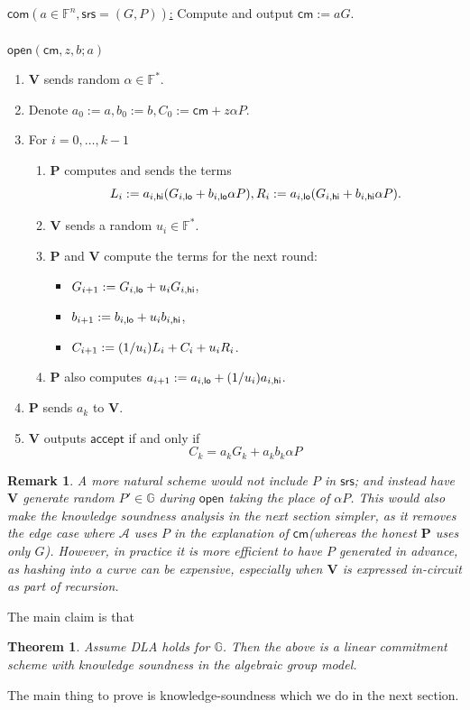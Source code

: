 \documentclass[11pt]{article} %
\newcommand{\G}{\ensuremath{{\mathbb G}}\xspace}
\newcommand{\F}{\ensuremath{\mathbb F}\xspace}
\newcommand{\Fstar}{\ensuremath{\mathbb F^*}\xspace}
\newcommand{\adv}{\ensuremath{\mathcal A}\xspace}
\newcommand{\srs}{\ensuremath{\mathsf{srs}}\xspace}
\newcommand{\com}{\ensuremath{\mathsf{com}}\xspace}
\newcommand{\cm}{\ensuremath{\mathsf{cm}}\xspace}
\newcommand{\open}{\ensuremath{\mathsf{open}}\xspace}
\newcommand{\acc}{\ensuremath{\mathsf{accept}}\xspace}
\newcommand{\defeq}{:=}
\newcommand{\prv}{\ensuremath{\mathsf{\mathbf{P}}}\xspace}
\newcommand{\ver}{\ensuremath{\mathsf{\mathbf{V}}}\xspace}
\newcommand{\fn}{\ensuremath{\F^n}\xspace}
\newtheorem{thm}{Theorem}
\newtheorem{remark}[lemma]{Remark}
\begin{document}
\noindent
\underline{$\com(a\in \fn,\srs=(G,P))$:}
Compute and output $\cm\defeq aG$. \\ \\ 
\noindent
\underline{$\open(\cm,z,b;a)$}
\begin{enumerate}
 \item \ver sends random $\alpha\in \Fstar$. 
\item Denote $a_0\defeq a, b_0\defeq b, C_0\defeq \cm + z \alpha P$.
 \item For $i=0,\ldots,k-1$
 \begin{enumerate}
  \item \prv computes and sends the terms 
  \[L_i\defeq \ahi(\glo+\blo \alpha P), R_i\defeq \alo(\ghi +\bhi \alpha P).\]
  \item \ver sends a random $u_i\in \Fstar$.
  
  \item \prv and \ver compute the terms for the next round:
  \begin{itemize}
 \item $\gnext \defeq \glo + u_i \ghi$,
 \item $\bnext \defeq \blo + u_i\bhi$,
 \item $\cnext \defeq (1/u_i) L_i + C_i + u_i R_i$.
  \end{itemize}
 \item \prv also computes $\anext \defeq \alo + (1/u_i) \ahi$.
 \end{enumerate}
\item \prv sends $a_k$ to \ver.
\item \ver outputs \acc if and only if
\[C_k= a_k G_k + a_k b_k \alpha P\]
\end{enumerate}
\begin{remark}
 A more natural scheme would not include $P$ in \srs; and instead have \ver generate random $P'\in \G$ during \open taking the place of $\alpha P$.
 This would also make the knowledge soundness analysis in the next section simpler, as it removes the edge case where \adv uses $P$ in
 the explanation of \cm (whereas the honest \prv uses only $G$).
 However, in practice it is more efficient to have $P$ generated in advance, as hashing into a curve can be expensive, especially when \ver is expressed in-circuit as part of recursion.
\end{remark}

The main claim is that 
\begin{thm}\label{thm:main}
Assume DLA holds for \G. Then the above is a linear commitment scheme with knowledge soundness in the algebraic group model.
 
\end{thm}
\noindent
The main thing to prove is knowledge-soundness which we do in the next section.
\end{document}
